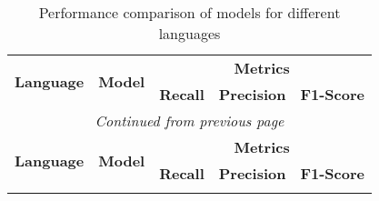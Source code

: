 
\onecolumn %
\begin{longtable}{llccc}
    \caption{Performance comparison of models for different languages} \label{tab:model_selection}                                                                                                 \\
    \toprule
    \multirow{2}{*}{\textbf{Language}}    & \multirow{2}{*}{\textbf{Model}}                                        & \multicolumn{3}{c}{\textbf{Metrics}}                                          \\
    \cmidrule(lr){3-5}
                                          &                                                                        & \textbf{Recall}                      & \textbf{Precision} & \textbf{F1-Score} \\
    \midrule
    \endfirsthead

    \multicolumn{5}{c}{\textit{Continued from previous page}}                                                                                                                                      \\
    \toprule
    \multirow{2}{*}{\textbf{Language}}    & \multirow{2}{*}{\textbf{Model}}                                        & \multicolumn{3}{c}{\textbf{Metrics}}                                          \\
    \cmidrule(lr){3-5}
                                          &                                                                        & \textbf{Recall}                      & \textbf{Precision} & \textbf{F1-Score} \\
    \midrule
    \endhead

    \endfoot

    \bottomrule
    \endlastfoot


\end{longtable}

